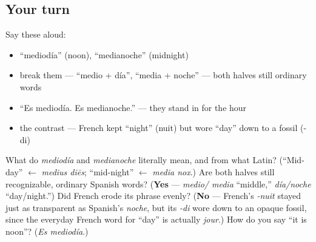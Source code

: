 \subsection*{Your turn}
Say these aloud:

\begin{itemize}
\raggedright
  \item \textquotedblleft{}mediodía\textquotedblright{} (noon), \textquotedblleft{}medianoche\textquotedblright{} (midnight)
  \item break them — \textquotedblleft{}medio + día\textquotedblright{}, \textquotedblleft{}media + noche\textquotedblright{} — both halves still ordinary words
  \item \textquotedblleft{}Es mediodía. Es medianoche.\textquotedblright{} — they stand in for the hour
  \item the contrast — French kept \textquotedblleft{}night\textquotedblright{} (nuit) but wore \textquotedblleft{}day\textquotedblright{} down to a fossil (-di)
\end{itemize}

\begin{tcolorbox}[breakable,colback=teal!4,colframe=teal!35!black,title={Before you move on}]
What do \emph{mediodía} and \emph{medianoche} literally mean, and from what Latin? (\textquotedblleft{}Mid-day\textquotedblright{} $\leftarrow$ \emph{medius diēs}; \textquotedblleft{}mid-night\textquotedblright{} $\leftarrow$ \emph{media nox}.) Are both halves still recognizable, ordinary Spanish words? (\textbf{Yes} — \emph{medio/ media} \textquotedblleft{}middle,\textquotedblright{} \emph{día/noche} \textquotedblleft{}day/night.\textquotedblright{}) Did French erode its phrase evenly? (\textbf{No} — French's \emph{-nuit} stayed just as transparent as Spanish's \emph{noche}, but its \emph{-di} wore down to an opaque fossil, since the everyday French word for \textquotedblleft{}day\textquotedblright{} is actually \emph{jour}.) How do you say \textquotedblleft{}it is noon\textquotedblright{}? (\emph{Es mediodía}.)
\end{tcolorbox}
